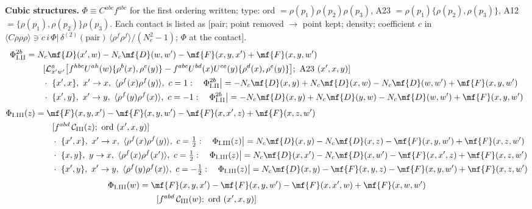 {\noindent\textbf{Cubic structures.} $\Phi\equiv C^{abc}f^{abc}$ for the first ordering written; type: ord $=\rho(p_{1})\rho(p_{2})\rho(p_{3})$, A23 $=\rho(p_{1})\{\rho(p_{2}),\rho(p_{3})\}$, A12 $=\{\rho(p_{1}),\rho(p_{2})\}\rho(p_{3})$. Each contact is listed as [pair; point removed $\to$ point kept; density; coefficient $c$ in $\langle C\rho\rho\rho\rangle\ni c\,i\,\Phi|\,\delta^{(2)}(\text{pair})\,\langle\rho^{f}\rho^{f}\rangle/(N_{c}^{2}-1)$; $\Phi$ at the contact].
\begin{align}
\Phi_{\rm I.II}^{2b}&=N_{c}\mf{D}(x',w)-N_{c}\mf{D}(w,w')-\mf{F}(x,y,x')+\mf{F}(x,y,w')\notag\\&\qquad[\mathcal{L}^{a}_{x'w'}\big[f^{hbc}U^{ah}(w)\{\rho^{b}(x),\rho^{c}(y)\}-f^{abc}U^{bd}(x)U^{ce}(y)\{\rho^{d}(x),\rho^{e}(y)\}\big];\ \text{A23}\ (x',x,y)]\notag\\
&\qquad\cdot\ \{x',x\},\ x'\to x,\ \langle\rho^{f}(x)\rho^{f}(y)\rangle,\ c=1:\quad \Phi_{\rm I.II}^{2b}\big|=-N_{c}\mf{D}(x,y)+N_{c}\mf{D}(x,w)-N_{c}\mf{D}(w,w')+\mf{F}(x,y,w')\notag\\
&\qquad\cdot\ \{x',y\},\ x'\to y,\ \langle\rho^{f}(y)\rho^{f}(x)\rangle,\ c=-1:\quad \Phi_{\rm I.II}^{2b}\big|=-N_{c}\mf{D}(x,y)+N_{c}\mf{D}(y,w)-N_{c}\mf{D}(w,w')+\mf{F}(x,y,w')\notag
\end{align}
\begin{align}
\Phi_{\rm I.III}(z)&=\mf{F}(x,y,x')-\mf{F}(x,y,w')-\mf{F}(x,x',z)+\mf{F}(x,z,w')\notag\\&\qquad[f^{abd}\,\mathcal{C}_{\rm III}(z);\ \text{ord}\ (x',x,y)]\notag\\
&\qquad\cdot\ \{x',x\},\ x'\to x,\ \langle\rho^{f}(x)\rho^{f}(y)\rangle,\ c=\tfrac{1}{2}:\quad \Phi_{\rm I.III}(z)\big|=N_{c}\mf{D}(x,y)-N_{c}\mf{D}(x,z)-\mf{F}(x,y,w')+\mf{F}(x,z,w')\notag\\
&\qquad\cdot\ \{x,y\},\ y\to x,\ \langle\rho^{f}(x)\rho^{f}(x')\rangle,\ c=\tfrac{1}{2}:\quad \Phi_{\rm I.III}(z)\big|=N_{c}\mf{D}(x,x')-N_{c}\mf{D}(x,w')-\mf{F}(x,x',z)+\mf{F}(x,z,w')\notag\\
&\qquad\cdot\ \{x',y\},\ x'\to y,\ \langle\rho^{f}(y)\rho^{f}(x)\rangle,\ c=-\tfrac{1}{2}:\quad \Phi_{\rm I.III}(z)\big|=N_{c}\mf{D}(x,y)-\mf{F}(x,y,z)-\mf{F}(x,y,w')+\mf{F}(x,z,w')\notag
\end{align}
\begin{align}
\Phi_{\rm I.III}(w)&=\mf{F}(x,y,x')-\mf{F}(x,y,w')-\mf{F}(x,x',w)+\mf{F}(x,w,w')\notag\\&\qquad[f^{abd}\,\mathcal{C}_{\rm III}(w);\ \text{ord}\ (x',x,y)]\notag\\

\end{align}}
